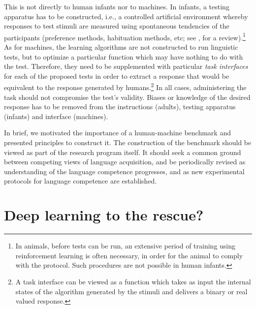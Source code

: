 \documentclass[jou,apacite]{apa6}
\begin{document}
This is not directly to human infants nor to machines. In infants, a testing apparatus has to be constructed, i.e., a controlled artificial environment whereby responses to test stimuli are measured using spontaneous tendencies of the participants (preference methods, habituation methods, etc; see , for a review).\footnote{In animals, before tests can be run, an extensive period of training using reinforcement learning is often necessary, in order for the animal to comply with the protocol. Such procedures are not possible in human infants.} As for machines, the learning algorithms are not constructed to run linguistic tests, but to optimize a particular function which may have nothing to do with the test. Therefore, they need to be supplemented with particular \emph{task interfaces} for each of the proposed tests in order to extract a response that would be equivalent to the response generated by humans.\footnote{A task interface can be viewed as a function which takes as input the internal states of the algorithm generated by the stimuli and delivers a binary or real valued response.} In all cases, administering the task should not compromise the test's validity. Biases or knowledge of the desired response has to be removed from the instructions (adults), testing apparatus (infants) and  interface (machines). 


In brief, we motivated the importance of a human-machine benchmark and presented principles to construct it. The construction of the benchmark should be viewed as part of the research program itself. It should seek a common ground between competing views of language acquisition, and be periodically revised as understanding of the language competence progresses, and as new experimental protocols for language competence are established. %










\section{Deep learning to the rescue? }\label{section:deep}
\end{document}
